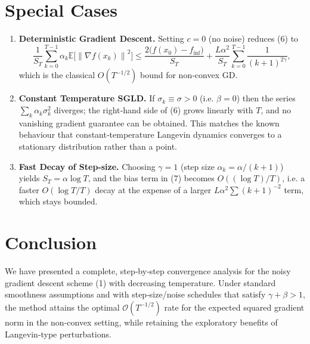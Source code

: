 \documentclass[11pt]{article}
\newcommand{\E}{\mathbb{E}}
\newcommand{\norm}[1]{\left\|#1\right\|}
\begin{document}
\section*{Special Cases}
\begin{enumerate}
\item \textbf{Deterministic Gradient Descent.}
  Setting $c=0$ (no noise) reduces (6) to
  \[
  \frac{1}{S_T}\sum_{k=0}^{T-1}\alpha_k
  \E\!\bigl[\norm{\nabla f(x_k)}^2\bigr]
  \le
  \frac{2\bigl(f(x_0)-f_{\inf}\bigr)}{S_T}
  +\frac{L\alpha^2}{S_T}\sum_{k=0}^{T-1}\frac{1}{(k+1)^{2\gamma}} ,
  \]
  which is the classical $O(T^{-1/2})$ bound for non‑convex GD.

\item \textbf{Constant Temperature SGLD.}
  If $\sigma_k\equiv\sigma>0$ (i.e. $\beta=0$) then the series
  $\sum_{k}\alpha_k\sigma_k^2$ diverges; the right‑hand side of (6)
  grows linearly with $T$, and no vanishing gradient guarantee can be
  obtained.  This matches the known behaviour that constant‑temperature
  Langevin dynamics converges to a stationary distribution rather
  than a point.

\item \textbf{Fast Decay of Step‑size.}
  Choosing $\gamma=1$ (step size $\alpha_k=\alpha/(k+1)$) yields
  $S_T = \alpha\log T$, and the bias term in (7) becomes
  $O((\log T)/T)$, i.e. a faster $O(\log T /T)$ decay at the expense of
  a larger $L\alpha^2\sum (k+1)^{-2}$ term, which stays bounded.
\end{enumerate}

\section*{Conclusion}
We have presented a complete, step‑by‑step convergence analysis for the
noisy gradient descent scheme (1) with decreasing temperature.  Under
standard smoothness assumptions and with step‑size/noise schedules that
satisfy $\gamma+\beta>1$, the method attains the optimal
$\mathcal O(T^{-1/2})$ rate for the expected squared gradient norm in the
non‑convex setting, while retaining the exploratory benefits of
Langevin‑type perturbations.
\end{document}
